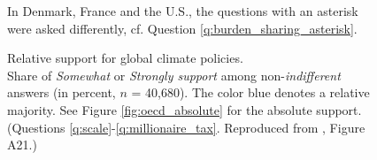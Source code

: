 \begin{figure} %
  \caption[Relative support for global climate policies]{Relative support for global climate policies. \\ Share of \textit{Somewhat} or \textit{Strongly support} among non-\textit{indifferent} answers (in percent, $n$ = 40,680). The color blue denotes a relative majority. See Figure \ref{fig:oecd_absolute} for the absolute support. (Questions \ref{q:scale}-\ref{q:millionaire_tax}. Reproduced from \citealp{dechezlepretre_fighting_2022}, Figure A21.)} 
  \label{fig:oecd} %
  {\footnotesize *In Denmark, France and the U.S., the questions with an asterisk were asked differently, cf. Question \ref{q:burden_sharing_asterisk}. } 
\end{figure}

